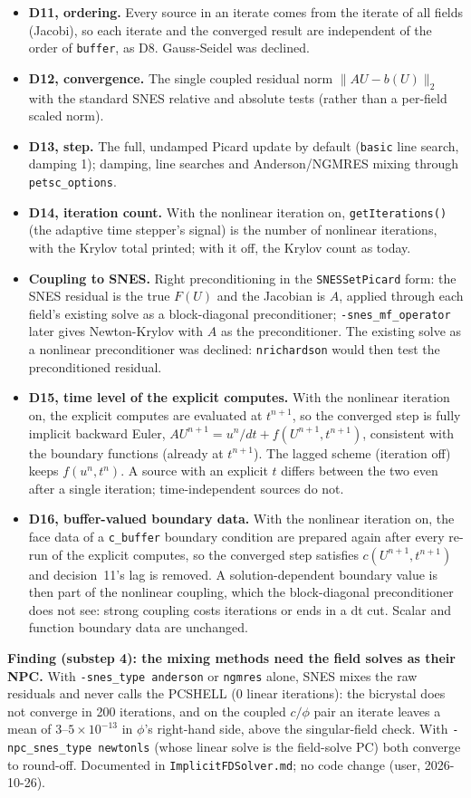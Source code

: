 \documentclass[11pt]{article}
\begin{document}
\begin{itemize}
\item \textbf{D11, ordering.} Every source in an iterate comes from the iterate
  of all fields (Jacobi), so each iterate and the converged result are
  independent of the order of \texttt{buffer}, as D8. Gauss-Seidel was declined.
\item \textbf{D12, convergence.} The single coupled residual norm
  $\|A U - b(U)\|_2$ with the standard SNES relative and absolute tests (rather
  than a per-field scaled norm).
\item \textbf{D13, step.} The full, undamped Picard update by default
  (\texttt{basic} line search, damping 1); damping, line searches and
  Anderson/NGMRES mixing through \texttt{petsc\_options}.
\item \textbf{D14, iteration count.} With the nonlinear iteration on,
  \texttt{getIterations()} (the adaptive time stepper's signal) is the number of
  nonlinear iterations, with the Krylov total printed; with it off, the Krylov
  count as today.
\item \textbf{Coupling to SNES.} Right preconditioning in the
  \texttt{SNESSetPicard} form: the SNES residual is the true $F(U)$ and the
  Jacobian is $A$, applied through each field's existing solve as a block-diagonal
  preconditioner; \texttt{-snes\_mf\_operator} later gives Newton-Krylov with $A$
  as the preconditioner. The existing solve as a nonlinear preconditioner was
  declined: \texttt{nrichardson} would then test the preconditioned residual.
\item \textbf{D15, time level of the explicit computes.} With the nonlinear
  iteration on, the explicit computes are evaluated at $t^{n+1}$, so the converged
  step is fully implicit backward Euler,
  $A U^{n+1} = u^n/dt + f(U^{n+1}, t^{n+1})$, consistent with the boundary
  functions (already at $t^{n+1}$). The lagged scheme (iteration off) keeps
  $f(u^n, t^n)$. A source with an explicit $t$ differs between the two even after
  a single iteration; time-independent sources do not.
\item \textbf{D16, buffer-valued boundary data.} With the nonlinear iteration on,
  the face data of a \texttt{c\_buffer} boundary condition are prepared again after
  every re-run of the explicit computes, so the converged step satisfies
  $c(U^{n+1}, t^{n+1})$ and decision~11's lag is removed. A solution-dependent
  boundary value is then part of the nonlinear coupling, which the block-diagonal
  preconditioner does not see: strong coupling costs iterations or ends in a dt
  cut. Scalar and function boundary data are unchanged.
\end{itemize}
\textbf{Finding (substep 4): the mixing methods need the field solves as their
NPC.} With \texttt{-snes\_type anderson} or \texttt{ngmres} alone, SNES mixes the
raw residuals and never calls the PCSHELL (0 linear iterations): the bicrystal
does not converge in 200 iterations, and on the coupled $c/\phi$ pair an iterate
leaves a mean of $3$--$5\times10^{-13}$ in $\phi$'s right-hand side, above the
singular-field check. With \texttt{-npc\_snes\_type newtonls} (whose linear
solve is the field-solve PC) both converge to round-off. Documented in
\texttt{ImplicitFDSolver.md}; no code change (user, 2026-10-26).
\end{document}

